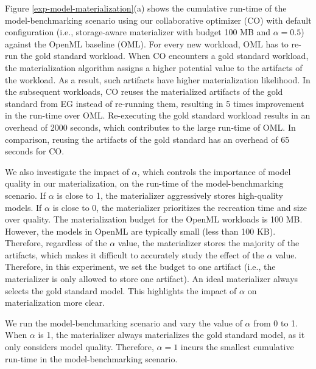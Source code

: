 Figure \ref{exp-model-materialization}(a) shows the cumulative run-time of the model-benchmarking scenario using our collaborative optimizer (CO) with default configuration (i.e., storage-aware materializer with budget 100 MB and $\alpha=0.5$) against the OpenML baseline (OML).
For every new workload, OML has to re-run the gold standard workload.
When CO encounters a gold standard workload, the materialization algorithm assigns a higher potential value to the artifacts of the workload.
As a result, such artifacts have higher materialization likelihood.
In the subsequent workloads, CO reuses the materialized artifacts of the gold standard from EG instead of re-running them, resulting in 5 times improvement in the run-time over OML.
Re-executing the gold standard workload results in an overhead of 2000 seconds, which contributes to the large run-time of OML.
In comparison, reusing the artifacts of the gold standard has an overhead of 65 seconds for CO.

We also investigate the impact of $\alpha$, which controls the importance of model quality in our materialization, on the run-time of the model-benchmarking scenario.
If $\alpha$ is close to 1, the materializer aggressively stores high-quality models.
If $\alpha$ is close to 0, the materializer prioritizes the recreation time and size over quality.
The materialization budget for the OpenML workloads is 100 MB.
However, the models in OpenML are typically small (less than 100 KB).
Therefore, regardless of the $\alpha$ value, the materializer stores the majority of the artifacts, which makes it difficult to accurately study the effect of the $\alpha$ value.
Therefore, in this experiment, we set the budget to one artifact (i.e., the materializer is only allowed to store one artifact).
An ideal materializer always selects the gold standard model.
This highlights the impact of $\alpha$ on materialization more clear.

We run the model-benchmarking scenario and vary the value of $\alpha$ from 0 to 1.
When $\alpha$ is 1, the materializer always materializes the gold standard model, as it only considers model quality.
Therefore, $\alpha=1$ incurs the smallest cumulative run-time in the model-benchmarking scenario.

